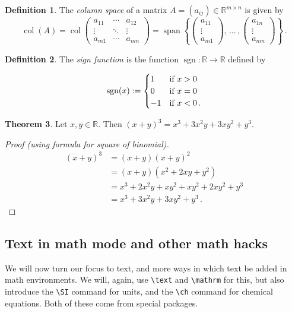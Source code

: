 \documentclass[11pt,letterpaper,titlepage]{article}
\numberwithin{equation}{section}
\numberwithin{figure}{section}
\numberwithin{table}{section}
\numberwithin{algorithm}{section}
\theoremstyle{definition}
\newtheorem{theorem}{Theorem}[section] %
\newtheorem{definition}[theorem]{Definition} %
\DeclareMathOperator{\col}{col}
\DeclareMathOperator{\spn}{span}
\newcommand{\R}{\mathbb{R}}
\begin{document}
\begin{definition} The \emph{column space} of a matrix $A = (a_{ij})\in\R^{m\times n}$ is given by
\[
\col(A)=
\col\begin{pmatrix}
a_{11} & \cdots & a_{12}\\
\vdots & \ddots & \vdots\\
a_{m1} & \cdots & a_{mn}
\end{pmatrix}
=
\spn\left\{
    \begin{pmatrix}
        a_{11}\\\vdots\\a_{m1}
    \end{pmatrix}
    , \, \ldots \, ,
    \begin{pmatrix}
        a_{1n}\\\vdots\\a_{mn}
    \end{pmatrix} 
\right\}\,.
\]
\end{definition}

\begin{definition}
The \emph{sign function} is the function $\operatorname{sgn}\colon \R\to\R$ defined by

\[
\operatorname{sgn}(x):=
\begin{cases}
1   &\text{if $x>0$}\\
0   &\text{if $x=0$}\\
-1  &\text{if $x<0$\,.}
\end{cases}
\]

\end{definition}

\begin{theorem}
\label{thm:cubic}
Let $x,y\in \R$. Then $(x+y)^3=x^3+3x^2y+3xy^2+y^3$.
\end{theorem}

\begin{proof}[Proof (using formula for square of binomial)]
\begin{align*}
(x+y)^3 &=(x+y)(x+y)^2\\
        &=(x+y)(x^2+2xy+y^2)\\
        &=x^3+2x^2y+xy^2+xy^2+2xy^2+y^3\\
        &=x^3+3x^2y+3xy^2+y^3\,.\tag*{\qedhere}
\end{align*}
\end{proof}

\subsection{Text in math mode and other math hacks}
We will now turn our focus to text, and more ways in which text  be added in math environments. We will, again, use \verb$\text$ and \verb$\mathrm$ for this, but also introduce the \verb$\SI$ command for units, and the \verb$\ch$ command for chemical equations. Both of these come from special packages.
\end{document}

